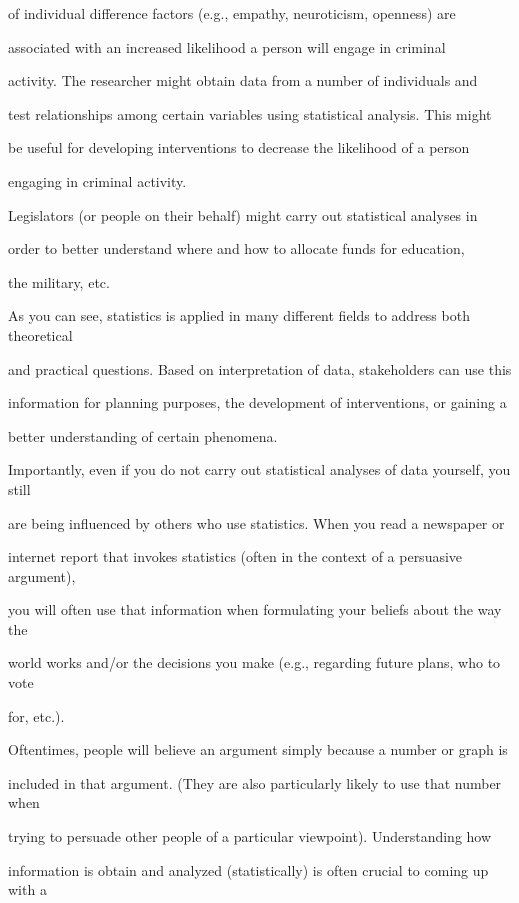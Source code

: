 \documentclass[
]{book}
\begin{document}
of individual difference factors (e.g., empathy, neuroticism, openness) are

associated with an increased likelihood a person will engage in criminal

activity. The researcher might obtain data from a number of individuals and

test relationships among certain variables using statistical analysis. This might

be useful for developing interventions to decrease the likelihood of a person

engaging in criminal activity.

Legislators (or people on their behalf) might carry out statistical analyses in

order to better understand where and how to allocate funds for education,

the military, etc.

As you can see, statistics is applied in many different fields to address both theoretical

and practical questions. Based on interpretation of data, stakeholders can use this

information for planning purposes, the development of interventions, or gaining a

better understanding of certain phenomena.

Importantly, even if you do not carry out statistical analyses of data yourself, you still

are being influenced by others who use statistics. When you read a newspaper or

internet report that invokes statistics (often in the context of a persuasive argument),

you will often use that information when formulating your beliefs about the way the

world works and/or the decisions you make (e.g., regarding future plans, who to vote

for, etc.).

Oftentimes, people will believe an argument simply because a number or graph is

included in that argument. (They are also particularly likely to use that number when

trying to persuade other people of a particular viewpoint). Understanding how

information is obtain and analyzed (statistically) is often crucial to coming up with a
\end{document}

